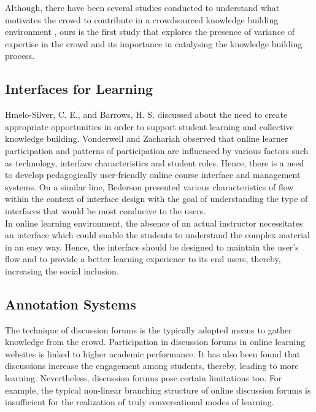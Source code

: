\documentclass{llncs}
\begin{document}
Although, there have been several studies conducted to understand what motivates the crowd to contribute in a crowdsourced knowledge building environment \cite{Cress2008}\cite{Nov2007}\cite{forte2008people}, ours is the first study that explores the presence of variance of expertise in the crowd and its importance in catalysing the knowledge building process. 
\subsection{Interfaces for Learning}
Hmelo-Silver, C. E., and Barrows, H. S.\cite{Hmelo-Silver2008} discussed about the need to create appropriate opportunities in order to support student learning and collective knowledge building. Vonderwell and Zachariah\cite{Vonderwell2005} observed that online learner participation and patterns of participation are influenced by various factors such as technology, interface characteristics and student roles. Hence, there is a need to develop pedagogically user-friendly online course interface and management systems. On a similar line, Bederson\cite{Bederson2004} presented various characteristics of flow within the context of interface design with the goal of understanding the type of interfaces that would be most conducive to the users.\\

In online learning environment, the absence of an actual instructor necessitates an interface which could enable the students to understand the complex material in an easy way. Hence, the interface should be designed to maintain the user’s flow and to provide a better learning experience to its end users, thereby, increasing the social inclusion\cite{Bederson2004}. 
\subsection{Annotation Systems}
The technique of discussion forums is the typically adopted means to gather knowledge from the crowd. Participation in discussion forums in online learning websites is linked to higher academic performance\cite{Davies2005}\cite{Deslauriers2011a}. It has also been found that discussions increase the engagement among students, thereby, leading to more learning\cite{Palmer2008}. Nevertheless, discussion forums pose certain limitations too. For example, the typical non-linear branching structure of online discussion forums is insufficient for the realization of truly conversational modes of learning\cite{Thomas2002}.\\
\end{document}
